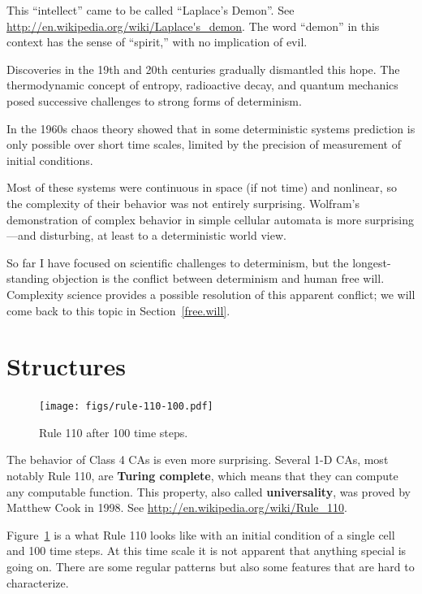 \documentclass[10pt]{book}
\begin{document}
This ``intellect'' came to be called ``Laplace's Demon''.
See \url{http://en.wikipedia.org/wiki/Laplace's_demon}.  The word
``demon'' in this context has the sense of ``spirit,'' with no
implication of evil.

Discoveries in the 19th and 20th centuries gradually dismantled
this hope.  The thermodynamic concept of entropy, radioactive decay,
and quantum mechanics posed successive challenges to strong
forms of determinism.

In the 1960s chaos theory showed that in some deterministic systems
prediction is only possible over short time scales,  limited by
the precision of measurement of initial conditions.

Most of these systems were continuous in space (if not time) and
nonlinear, so the complexity of their behavior was not entirely
surprising.  Wolfram's demonstration of complex behavior in simple
cellular automata is more surprising---and disturbing, at least to a
deterministic world view.

So far I have focused on scientific challenges to determinism, but the
longest-standing objection is the conflict between
determinism and human free will.  Complexity science provides
a possible resolution of this apparent conflict; we will come
back to this topic in Section~\ref{free.will}.


\section{Structures}

\begin{figure}
\centerline{\texttt{[image: figs/rule-110-100.pdf]}}
\caption{Rule 110 after 100 time steps.\label{fig.rule110}}
\end{figure}

The behavior of Class 4 CAs is even more surprising.  Several 1-D CAs,
most notably Rule 110, are {\bf Turing complete}, which means that
they can compute any computable function.  This property, also called
{\bf universality}, was proved by Matthew Cook in 1998.  See
\url{http://en.wikipedia.org/wiki/Rule_110}.

Figure~\ref{fig.rule110} is a what Rule 110 looks like with an initial
condition of a single cell and 100 time steps.
At this time scale it is not apparent that anything special is
going on.  There are some regular patterns but also some features
that are hard to characterize.
\end{document}
